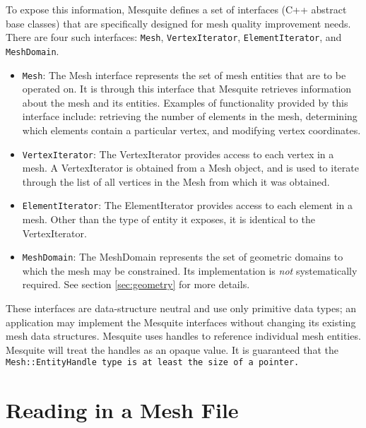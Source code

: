 To expose this information, Mesquite defines a set of interfaces 
(C++ abstract base classes) that are specifically designed for mesh
quality improvement needs.  There are four such interfaces: \texttt{Mesh},
\texttt{VertexIterator}, \texttt{ElementIterator}, and \texttt{MeshDomain}.
\begin{itemize}
\item \texttt{Mesh}: The Mesh interface represents the set of mesh
entities that are to be operated on.  It is through this interface
that Mesquite retrieves information about the mesh and its entities.
Examples of functionality provided by this interface include:
retrieving the number of elements in the mesh, determining which
elements contain a particular vertex, and modifying vertex
coordinates.
\item \texttt{VertexIterator}: The VertexIterator provides access to each
vertex in a mesh.  A VertexIterator is obtained from a Mesh object,
and is used to iterate through the list of all vertices in the Mesh
from which it was obtained.
\item \texttt{ElementIterator}: The ElementIterator provides access to
each element in a mesh.  Other than the type of entity it exposes, it
is identical to the VertexIterator.
\item \texttt{MeshDomain}: The MeshDomain represents the set of geometric
domains to which the mesh may be constrained. Its implementation is \emph{not} systematically 
required. See section \ref{sec:geometry} for more details. 
\end{itemize}
These interfaces are data-structure neutral and use only primitive
data types; an application may implement the Mesquite interfaces
without changing its existing mesh data structures.  Mesquite uses
handles to reference individual mesh entities.  Mesquite will treat
the handles as an opaque value.  It is guaranteed that the \tt{Mesh::EntityHandle} type is at least the size of a pointer. 

\section{Reading in a Mesh File} \label{sec:meshFiles}

